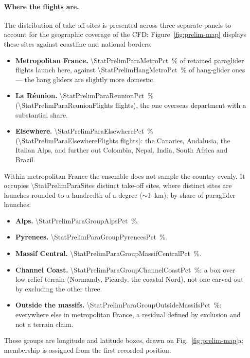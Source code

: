 \paragraph{Where the flights are.}
The distribution of take-off sites is presented across three separate panels to account for
the geographic coverage of the CFD: Figure~\ref{fig:prelim-map} displays these sites against
coastline and national borders.
\begin{itemize}
  \item \textbf{Metropolitan France.} \SI{\StatPrelimParaMetroPct}{\percent} of retained
        paraglider flights launch here, against \SI{\StatPrelimHangMetroPct}{\percent} of
        hang-glider ones --- the hang gliders are slightly more domestic.
  \item \textbf{La R\'eunion.} \SI{\StatPrelimParaReunionPct}{\percent}
        (\num{\StatPrelimParaReunionFlights} flights), the one overseas department with a
        substantial share.
  \item \textbf{Elsewhere.} \SI{\StatPrelimParaElsewherePct}{\percent}
        (\num{\StatPrelimParaElsewhereFlights} flights): the Canaries, Andalusia, the
        Italian Alps, and further out Colombia, Nepal, India, South Africa and Brazil.
\end{itemize}

Within metropolitan France the ensemble does not sample the country evenly. It occupies
\num{\StatPrelimParaSites} distinct take-off sites, where distinct sites are launches
rounded to a hundredth of a degree ($\sim$\SI{1}{\kilo\meter}); by share of paraglider
launches:
\begin{itemize}
  \item \textbf{Alps.} \SI{\StatPrelimParaGroupAlpsPct}{\percent}.
  \item \textbf{Pyrenees.} \SI{\StatPrelimParaGroupPyreneesPct}{\percent}.
  \item \textbf{Massif Central.} \SI{\StatPrelimParaGroupMassifCentralPct}{\percent}.
  \item \textbf{Channel Coast.} \SI{\StatPrelimParaGroupChannelCoastPct}{\percent}: a box
        over low-relief terrain (Normandy, Picardy, the coastal Nord), not one
        carved out by excluding the other three.
  \item \textbf{Outside the massifs.} \SI{\StatPrelimParaGroupOutsideMassifsPct}{\percent}:
        everywhere else in metropolitan France, a residual defined by exclusion and not a
        terrain claim.
\end{itemize}
These groups are longitude and latitude boxes, drawn
on Fig.~\ref{fig:prelim-map}a; membership is assigned from the first recorded position.

